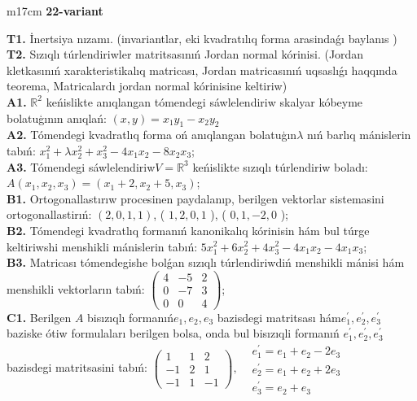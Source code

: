\documentclass{article}
\begin{document}
\begin{tabular}{m{17cm}}
\textbf{22-variant}
\newline

\textbf{T1.} İnertsiya nızamı. (invariantlar,  eki kvadratılıq forma arasindaǵı baylanıs ) \\
\textbf{T2.} Sızıqlı túrlendiriwler matritsasınıń Jordan normal kórinisi. (Jordan kletkasınıń xarakteristikalıq matricası, Jordan matricasınıń uqsaslıǵı haqqında teorema,  Matricalardı jordan normal kórinisine keltiriw) \\
\textbf{A1.} \(\mathbb{R}^{2}\) keńislikte anıqlangan tómendegi sáwlelendiriw skalyar kóbeyme bolatuģının anıqlań: \((x,y) = x_{1}y_{1} - x_{2}y_{2}\) \\
\textbf{A2.} Tómendegi kvadratlıq forma oń anıqlangan bolatuģın\(\lambda\) nıń barlıq mánislerin tabıń: \(x_{1}^{2} + \lambda x_{2}^{2} + x_{3}^{2} - 4x_{1}x_{2} - 8x_{2}x_{3}\); \\
\textbf{A3.} Tómendegi sáwlelendiriw\(V = \mathbb{R}^{3}\) keńislikte sızıqlı túrlendiriw boladı: \(A\left( x_{1},x_{2},x_{3} \right) = \left( x_{1} + 2,x_{2} + 5,x_{3} \right)\); \\
\textbf{B1.} Ortogonallastırıw procesinen paydalanıp, berilgen vektorlar sistemasini ortogonallastirıń: \((2,0,1,1)\), ( \(1,2,0,1\) ), ( \(0,1, - 2,0\) ); \\
\textbf{B2.} Tómendegi kvadratlıq formanıń kanonikalıq kórinisin hám bul túrge keltiriwshi menshikli mánislerin tabıń: \(5x_{1}^{2} + 6x_{2}^{2} + 4x_{3}^{2} - 4x_{1}x_{2} - 4x_{1}x_{3}\); \\
\textbf{B3.} Matricası tómendegishe bolǵan sızıqlı túrlendiriwdiń menshikli mánisi hám menshikli vektorların tabıń: \(\begin{pmatrix} 4 & - 5 & 2 \\ 0 & - 7 & 3 \\ 0 & 0 & 4 \end{pmatrix}\); \\
\textbf{C1.} Berilgen \(A\) bisızıqlı formanıń\(e_{1},e_{2},e_{3}\) bazisdegi matritsası hám\(e_{1}^{'},e_{2}^{'},e_{3}^{'}\) baziske ótiw formulaları berilgen bolsa, onda bul bisızıqli formanıń \(e_{1}^{'},e_{2}^{'},e_{3}^{'}\) bazisdegi matritsasini tabıń: \(\begin{pmatrix} 1 & 1 & 2 \\  - 1 & 2 & 1 \\  - 1 & 1 & - 1 \end{pmatrix},\begin{matrix}  & e_{1}^{'} = e_{1} + e_{2} - 2e_{3} \\  & e_{2}^{'} = e_{1} + e_{2} + 2e_{3} \\  & e_{3}^{'} = e_{2} + e_{3} \end{matrix}\) \\

\end{tabular}
\end{document}
